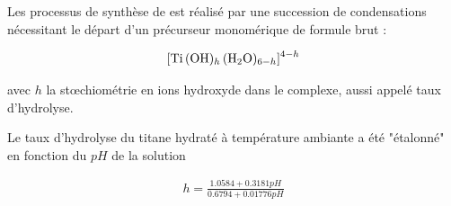 \documentclass[twoside,a4paper,11pt,addpoints]{exam}%
\begin{document}






Les processus de synthèse de  est réalisé par une succession de condensations nécessitant le départ d'un précurseur monomérique de formule brut : 

\begin{align*}
\ce{[Ti (OH)_h (H2O)_{6-h}]^{4-h}}
\end{align*}

avec $h$ la st{\oe}chiométrie en ions hydroxyde dans le complexe, aussi appelé taux d'hydrolyse.



Le taux d'hydrolyse du titane hydraté à température ambiante a été "étalonné" en fonction du $pH$ de la solution 

\begin{align}
h = \frac{1.0584 + 0.3181 pH}{0.6794 + 0.01776 pH}
\label{eq:h_Tamb}
\end{align}
\end{document}
